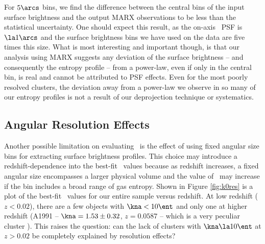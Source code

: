 For $5\arcs$ bins, we find the difference between the central bins of the
input surface brightness and the output MARX observations to be less
than the statistical uncertainty. One should expect this result, as
the on-axis \chandra\ PSF is $\la 1\arcs$ and the surface brightness bins
we have used on the data are five times this size. What is most
interesting and important though, is that our analysis using MARX
suggests any deviation of the surface brightness -- and consequently
the entropy profile -- from a power-law, even if only in the central
bin, is real and cannot be attributed to PSF effects. Even for the
most poorly resolved clusters, the deviation away from a power-law we
observe in so many of our entropy profiles is not a result of our
deprojection technique or systematics.

\subsection{Angular Resolution Effects}
\label{sec:entsuppangres}

Another possible limitation on evaluating \kna\ is the effect of using
fixed angular size bins for extracting surface brightness
profiles. This choice may introduce a redshift-dependence into the
best-fit \kna\ values because as redshift increases, a fixed angular
size encompasses a larger physical volume and the value of \kna\ may
increase if the bin includes a broad range of gas entropy. Shown in
Figure \ref{fig:k0res} is a plot of the best-fit \kna\ values for our
entire sample versus redshift. At low redshift ($z < 0.02$), there are
a few objects with $\kna < 10 \ent$ and only one at higher redshift
(A1991 -- $\kna = 1.53 \pm 0.32$, $z = 0.0587$ -- which is a very
peculiar cluster \citep{2004ApJ...613..180S}). This raises the
question: can the lack of clusters with $\kna \la 10 \ent$ at $z >
0.02$ be completely explained by resolution effects?

